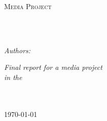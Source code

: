 \documentclass[
11pt, %
english, %
singlespacing, %
headsepline, %
]{mediaproject} %
\author{Christon-Ragavan Nadar and Shivam Sani} %
\begin{document}
\frontmatter %

\pagestyle{plain} %


\begin{titlepage}
\begin{center}

\vspace*{.06\textheight}
{\scshape\LARGE \univname\par}\vspace{1.5cm} %
\textsc{\Large Media Project}\\[0.5cm] %

\HRule \\[0.4cm] %
{\huge \bfseries \ttitle\par}\vspace{0.4cm}  %
\HRule \\[1.5cm] %
 


\begin{minipage}[t]{\textwidth}
        \centering
        \emph{Authors:}\\
        \href{http://www.christonragavan.com}{\authorname} %

\end{minipage}


\vspace*{.06\textheight}


\large \textit{Final report for a media project}\\[0.3cm] %
\textit{in the}\\[0.4cm]
\groupname\\\deptname\\[2cm] %
 
\vfill

{\large \today}\\[4cm] %
 

\end{center}
\end{titlepage}
\end{document}
